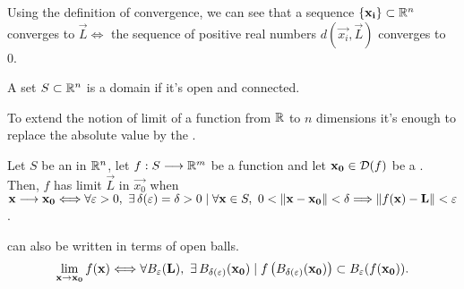\begin{remark}
    Using the definition of convergence, we can see that a sequence $\set{\vec{x_i}}\subset\Rtn$ converges to $\vec{L}\iff$
    the sequence of positive real numbers $d(\vec{x_i}, \vec{L})$ converges to 0. \wtf
\end{remark}

\begin{defn}[Domain]\label{def:domain-set}
    A set $S\subset\Rtn$ is a domain if it's open and connected.
\end{defn}

To extend the notion of limit of a function from $\R$ to $n$ dimensions it's enough to replace the absolute value
by the .


\begin{defn}\label{def:functional-limit}
    Let $S$ be an  in $\Rtn$, let $\appl{f}{S}{\R^m}$ be a function and let $\vec{x_0}\in\dom{f}$ be
    a . Then, $f$ has limit $\vec{L}$ in $\vec{x_0}$ when $\vec{x}\longrightarrow\vec{x_0}
    \iff\forall\epsilon > 0,\ \exists \delta(\epsilon) = \delta > 0 \st
    \forall\vec{x}\in S,\ 0 < \vnorm{\vec{x} - \vec{x_0}} < \delta\implies\vnorm{f(\vec{x}) - \vec{L}} < \epsilon$.
\end{defn}

\begin{remark}
     can also be written in terms of open balls.
    \begin{equation}
        \lim_{\vec{x}\to\vec{x_0}}f(\vec{x})\iff\forall\oball{\epsilon}{\vec{L}},\ \exists\oball{\delta(\epsilon)}{\vec{x_0}}
            \st f\left(\oball{\delta(\epsilon)}{\vec{x_0}}\right)\subset\oball{\epsilon}{f(\vec{x_0})}.
    \end{equation}
\end{remark}

